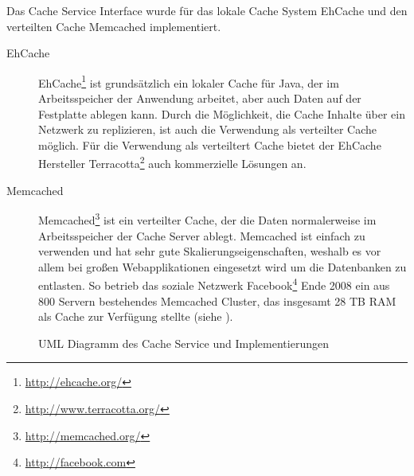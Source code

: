 Das Cache Service Interface wurde für das lokale Cache System EhCache
und den verteilten Cache Memcached implementiert.

\begin{description}
\item[EhCache] EhCache\footnote{\url{http://ehcache.org/}} ist grundsätzlich ein
lokaler Cache für Java, der im Arbeitsspeicher der Anwendung arbeitet, aber auch
Daten auf der Festplatte ablegen kann. Durch die Möglichkeit, die Cache Inhalte
über ein Netzwerk zu replizieren, ist auch die Verwendung als verteilter Cache
möglich. Für die Verwendung als verteiltert Cache bietet der EhCache Hersteller
Terracotta\footnote{\url{http://www.terracotta.org/}} auch kommerzielle Lösungen
an.
\item[Memcached] Memcached\footnote{\url{http://memcached.org/}} ist ein
verteilter Cache, der die Daten normalerweise im Arbeitsspeicher der Cache Server
ablegt. Memcached ist einfach zu verwenden und hat sehr gute
Skalierungseigenschaften, weshalb es vor allem bei großen Webapplikationen
eingesetzt wird um die Datenbanken zu entlasten. So betrieb das soziale Netzwerk
Facebook\footnote{\url{http://facebook.com}} Ende 2008 ein aus 800 Servern
bestehendes Memcached Cluster, das insgesamt 28 TB RAM als Cache zur Verfügung
stellte (siehe \cite{saab:2008}).
\end{description}

\begin{figure}[bth]
	\caption{UML Diagramm des Cache Service und Implementierungen}
\end{figure}

